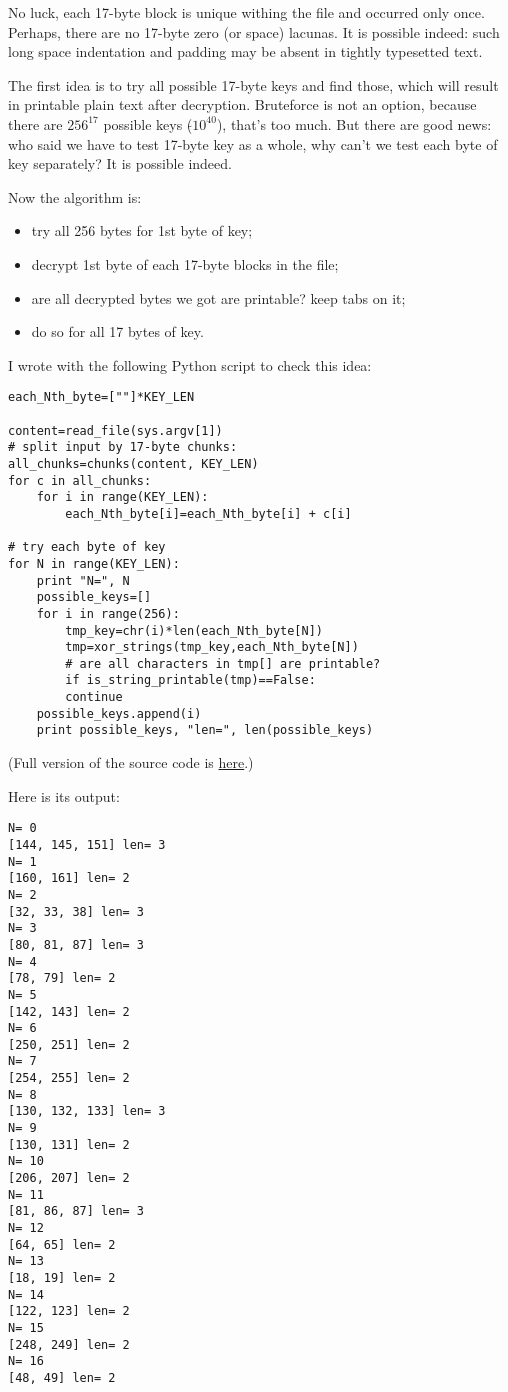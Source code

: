 No luck, each 17-byte block is unique withing the file and occurred only once.
Perhaps, there are no 17-byte zero (or space) lacunas.
It is possible indeed: such long space indentation and padding may be absent in tightly typesetted text.

The first idea is to try all possible 17-byte keys and find those, which will result in printable plain text after decryption.
Bruteforce is not an option, because there are $256^{17}$ possible keys ($\tilde{}10^{40}$), that's too much.
But there are good news: who said we have to test 17-byte key as a whole, why can't we test each byte of key separately?
It is possible indeed.

Now the algorithm is:

\begin{itemize}
\item try all 256 bytes for 1st byte of key;
\item decrypt 1st byte of each 17-byte blocks in the file;
\item are all decrypted bytes we got are printable? keep tabs on it;
\item do so for all 17 bytes of key.
\end{itemize}

I wrote with the following Python script to check this idea:

\begin{lstlisting}[caption=Python script]
each_Nth_byte=[""]*KEY_LEN

content=read_file(sys.argv[1])
# split input by 17-byte chunks:
all_chunks=chunks(content, KEY_LEN)
for c in all_chunks:
    for i in range(KEY_LEN):
        each_Nth_byte[i]=each_Nth_byte[i] + c[i]

# try each byte of key
for N in range(KEY_LEN):
    print "N=", N
    possible_keys=[]
    for i in range(256):
        tmp_key=chr(i)*len(each_Nth_byte[N])
        tmp=xor_strings(tmp_key,each_Nth_byte[N])
        # are all characters in tmp[] are printable?
        if is_string_printable(tmp)==False:
	    continue
	possible_keys.append(i)
    print possible_keys, "len=", len(possible_keys)
\end{lstlisting}

(Full version of the source code is \href{https://github.com/dennis714/yurichev.com/blob/master/blog/XOR_mask_2/files/decrypt2.py}{here}.)

Here is its output:

\begin{lstlisting}
N= 0
[144, 145, 151] len= 3
N= 1
[160, 161] len= 2
N= 2
[32, 33, 38] len= 3
N= 3
[80, 81, 87] len= 3
N= 4
[78, 79] len= 2
N= 5
[142, 143] len= 2
N= 6
[250, 251] len= 2
N= 7
[254, 255] len= 2
N= 8
[130, 132, 133] len= 3
N= 9
[130, 131] len= 2
N= 10
[206, 207] len= 2
N= 11
[81, 86, 87] len= 3
N= 12
[64, 65] len= 2
N= 13
[18, 19] len= 2
N= 14
[122, 123] len= 2
N= 15
[248, 249] len= 2
N= 16
[48, 49] len= 2
\end{lstlisting}


